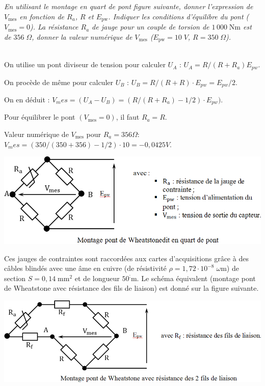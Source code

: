 \documentclass[10pt,fleqn]{article} %
\begin{document}
\begin{multicols}{2}
\subparagraph{}
\textit{En utilisant le montage en quart de pont figure suivante, donner l'expression de $V_{\text{mes}}$ en fonction de $R_a$, $R$ et $E_{\text{pw}}$. Indiquer les conditions d'équilibre du pont ($V_{\text{mes}}=0$). La résistance $R_a$ de jauge pour un couple de torsion de $1\,000\;\text{Nm}$ est de $356 \; \Omega$, donner la valeur numérique de $V_{\text{mes}}$ ($E_{\text{pw}}  =10\;V$, $R=350 \; \Omega$).}


\ifprof
\begin{corrige}~\\

On utilise un pont diviseur de tension pour calculer $U_A$ :	$U_A=  R/(R+R_a )E_{pw}$.

On procède de même pour calculer $U_B$ : $U_B=  R/(R+R)\cdot E_{pw}=E_{pw}/2$.

On en déduit : $V_mes=(U_A-U_B)= (R/(R+ R_a )- 1/2)\cdot E_{pw} )$.

Pour équilibrer le pont $(V_{\text{mes}}=0)$, il faut $R_a= R$.

Valeur numérique de $V_{\text{mes}}$ pour $R_a=356 \Omega$:	$V_mes=( 350/(350+ 356)- 1/2)\cdot 10=-0,0425 V$.

\end{corrige}
\else
\fi


\begin{center}
\includegraphics[width=.95\linewidth]{images/montage_01}
\end{center}


Ces jauges de contraintes sont raccordées aux cartes d'acquisitions grâce à des câbles blindés avec une âme en cuivre (de résistivité $\rho=1,72\cdot 10^{-8}  \;\omega\text{m}$) de section $S=0,14\;\text{mm}^2$ et de longueur $50^;\text{m}$. Le schéma équivalent (montage pont de Wheatstone avec résistance des fils de liaison) est donné sur la figure suivante.

\begin{center}
\includegraphics[width=.95\linewidth]{images/montage_02}
\end{center}



\end{multicols}
\end{document}
